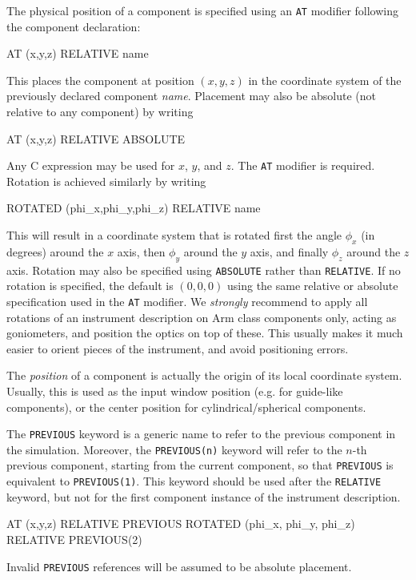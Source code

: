 The physical position of a component is specified using an \texttt{AT} modifier
following the component declaration:
  
\begin{mcstas}
  AT (x,y,z) RELATIVE name
\end{mcstas}
This places the component at position $(x,y,z)$ in the coordinate system
of the previously declared component \textit{name}. Placement may also
be absolute (not relative to any component) by writing
\begin{mcstas}
  AT (x,y,z) RELATIVE ABSOLUTE
\end{mcstas}
Any C expression may be used for $x$, $y$, and $z$. The \texttt{AT}
modifier is required.
Rotation is achieved similarly by writing 
\begin{mcstas}
  ROTATED (phi_x,phi_y,phi_z) RELATIVE name
\end{mcstas}
This will result in a coordinate system that is rotated first the angle $\phi_x$
(in degrees) around the $x$ axis, then $\phi_y$ around the $y$ axis, and finally
$\phi_z$ around the $z$ axis. Rotation may also be specified using
\texttt{ABSOLUTE} rather than \texttt{RELATIVE}. If no rotation is specified,
the default is $(0,0,0)$ using the same relative or absolute specification used
in the \texttt{AT} modifier. We \emph{strongly} recommend to apply all rotations
of an instrument description on Arm class components only, acting as
goniometers, and position the optics on top of these. This usually makes it much
easier to orient pieces of the instrument, and avoid positioning errors.

The \emph{position} of
a component is actually the origin of its local coordinate
system. Usually, this is used as the input window position (e.g. for
guide-like components), or the center position for
cylindrical/spherical components.

The \texttt{PREVIOUS}  keyword is a generic name to
refer to the previous component in the simulation. Moreover, the
\texttt{PREVIOUS(n)} keyword will refer to the $n$-th previous component,
starting from the current component, so that \texttt{PREVIOUS} is equivalent to
\texttt{PREVIOUS(1)}. This keyword should be used after the \texttt{RELATIVE}
keyword, but not for the first component instance of the instrument description.
\begin{mcstas}
AT (x,y,z) RELATIVE PREVIOUS
ROTATED (phi_x, phi_y, phi_z) RELATIVE PREVIOUS(2)
\end{mcstas}
Invalid \texttt{PREVIOUS} references will be assumed to be absolute placement.

